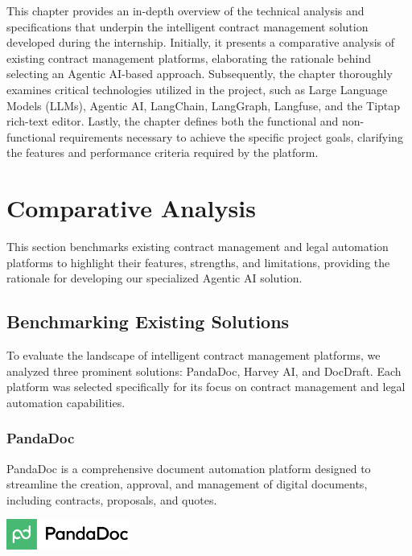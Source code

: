 This chapter provides an in-depth overview of the technical analysis and specifications that underpin the intelligent contract management solution developed during the internship. Initially, it presents a comparative analysis of existing contract management platforms, elaborating the rationale behind selecting an Agentic AI-based approach. Subsequently, the chapter thoroughly examines critical technologies utilized in the project, such as Large Language Models (LLMs), Agentic AI, LangChain, LangGraph, Langfuse, and the Tiptap rich-text editor. Lastly, the chapter defines both the functional and non-functional requirements necessary to achieve the specific project goals, clarifying the features and performance criteria required by the platform.

\newpage
{}
\hypertarget{secondchapter}{}
\section{Comparative Analysis}

This section benchmarks existing contract management and legal automation platforms to highlight their features, strengths, and limitations, providing the rationale for developing our specialized Agentic AI solution.

\subsection{Benchmarking Existing Solutions}
To evaluate the landscape of intelligent contract management platforms, we analyzed three prominent solutions: PandaDoc, Harvey AI, and DocDraft. Each platform was selected specifically for its focus on contract management and legal automation capabilities.

\subsubsection{PandaDoc}
PandaDoc is a comprehensive document automation platform designed to streamline the creation, approval, and management of digital documents, including contracts, proposals, and quotes.\mynewline

\begin{center}
    \centering
    \includegraphics[width=0.3\textwidth]{Images/PandaDoc_logo.png}
     \cite{pandadoc_logo}
    \label{fig:pandadoc_logo}
\end{center}

